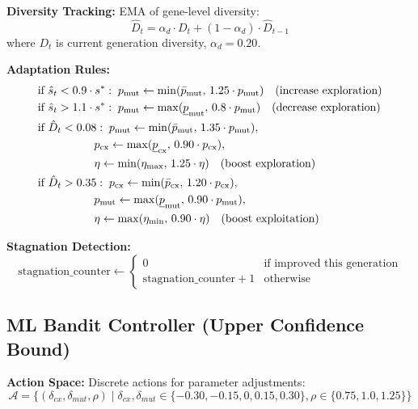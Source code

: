 \documentclass[12pt,a4paper]{article}
\begin{document}
\textbf{Diversity Tracking:}
EMA of gene-level diversity:
\begin{equation}
\hat{D}_t = \alpha_d \cdot D_t + (1 - \alpha_d) \cdot \hat{D}_{t-1} \label{eq:diversity_ema}
\end{equation}
where $D_t$ is current generation diversity, $\alpha_d = 0.20$.

\textbf{Adaptation Rules:}
\begin{align}
&\text{if } \hat{s}_t < 0.9 \cdot s^*:\; p_{\text{mut}} \leftarrow \min(\bar{p}_{\text{mut}},\, 1.25 \cdot p_{\text{mut}}) \quad \text{(increase exploration)} \label{eq:heuristic_low_success} \\
&\text{if } \hat{s}_t > 1.1 \cdot s^*:\; p_{\text{mut}} \leftarrow \max(\underline{p}_{\text{mut}},\, 0.8 \cdot p_{\text{mut}}) \quad \text{(decrease exploration)} \label{eq:heuristic_high_success} \\
&\text{if } \hat{D}_t < 0.08:\; p_{\text{mut}} \leftarrow \min(\bar{p}_{\text{mut}},\, 1.35 \cdot p_{\text{mut}}), \notag \\
&\quad \quad \quad \quad \quad p_{\text{cx}} \leftarrow \max(\underline{p}_{\text{cx}},\, 0.90 \cdot p_{\text{cx}}), \notag \\
&\quad \quad \quad \quad \quad \eta \leftarrow \min(\eta_{\max},\, 1.25 \cdot \eta) \quad \text{(boost exploration)} \label{eq:heuristic_low_diversity} \\
&\text{if } \hat{D}_t > 0.35:\; p_{\text{cx}} \leftarrow \min(\bar{p}_{\text{cx}},\, 1.20 \cdot p_{\text{cx}}), \notag \\
&\quad \quad \quad \quad \quad p_{\text{mut}} \leftarrow \max(\underline{p}_{\text{mut}},\, 0.90 \cdot p_{\text{mut}}), \notag \\
&\quad \quad \quad \quad \quad \eta \leftarrow \max(\eta_{\min},\, 0.90 \cdot \eta) \quad \text{(boost exploitation)} \label{eq:heuristic_high_diversity}
\end{align}

\textbf{Stagnation Detection:}
\begin{equation}
\text{stagnation\_counter} \leftarrow \begin{cases}
0 & \text{if improved this generation} \\
\text{stagnation\_counter} + 1 & \text{otherwise}
\end{cases} \label{eq:stagnation_detection}
\end{equation}

\subsection{ML Bandit Controller (Upper Confidence Bound)}
\textbf{Action Space:}
Discrete actions for parameter adjustments:
\begin{equation}
\mathcal{A} = \{(\delta_{cx}, \delta_{mut}, \rho) \mid \delta_{cx},\delta_{mut} \in \{-0.30,-0.15,0,0.15,0.30\}, \rho \in \{0.75,1.0,1.25\}\} \label{eq:bandit_action_space}
\end{equation}
\end{document}
